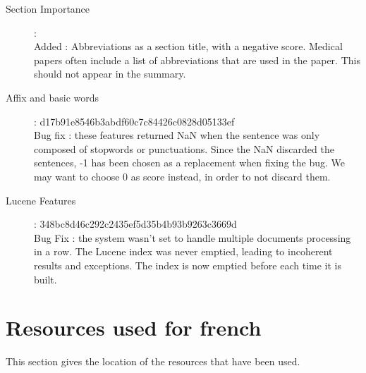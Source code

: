 \documentclass[a4paper,10pt]{article}
\begin{document}
\begin{description}
\item[Section Importance] : \hfill \\
  Added : Abbreviations as a section title, with a negative
  score. Medical papers often include a list of abbreviations that are
  used in the paper. This should not appear in the summary.

\item[Affix and basic words] : \hfill
  d17b91e8546b3abdf60c7c84426c0828d05133ef \\
  Bug fix : these features returned NaN when the sentence was only
  composed of stopwords or punctuations. Since the NaN discarded the
  sentences, -1 has been chosen as a replacement when fixing the
  bug. We may want to choose 0 as score instead, in order to not
  discard them.

\item[Lucene Features] : \hfill
  348bc8d46c292c2435ef5d35b4b93b9263c3669d\\
  Bug Fix : the system wasn't set to handle multiple documents
  processing in a row. The Lucene index was never emptied, leading to
  incoherent results and exceptions. The index is now emptied before
  each time it is built.

\end{description}

\section{Resources used for french}
\label{sec:res4french}

This section gives the location of the resources that have been used.
\end{document}
